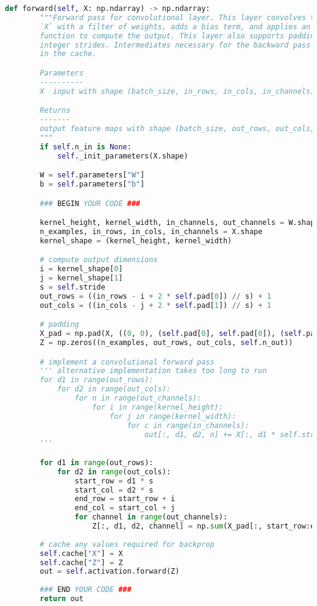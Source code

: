 \begin{lstlisting}[language=Python]
    def forward(self, X: np.ndarray) -> np.ndarray:
        """Forward pass for convolutional layer. This layer convolves the input
        `X` with a filter of weights, adds a bias term, and applies an activation
        function to compute the output. This layer also supports padding and
        integer strides. Intermediates necessary for the backward pass are stored
        in the cache.

        Parameters
        ----------
        X  input with shape (batch_size, in_rows, in_cols, in_channels)

        Returns
        -------
        output feature maps with shape (batch_size, out_rows, out_cols, out_channels)
        """
        if self.n_in is None:
            self._init_parameters(X.shape)

        W = self.parameters["W"]
        b = self.parameters["b"]

        ### BEGIN YOUR CODE ###

        kernel_height, kernel_width, in_channels, out_channels = W.shape
        n_examples, in_rows, in_cols, in_channels = X.shape
        kernel_shape = (kernel_height, kernel_width)

        # compute output dimensions
        i = kernel_shape[0]
        j = kernel_shape[1]
        s = self.stride
        out_rows = ((in_rows - i + 2 * self.pad[0]) // s) + 1
        out_cols = ((in_cols - j + 2 * self.pad[1]) // s) + 1

        # padding
        X_pad = np.pad(X, ((0, 0), (self.pad[0], self.pad[0]), (self.pad[1], self.pad[1]), (0, 0)), mode='constant')
        Z = np.zeros((n_examples, out_rows, out_cols, self.n_out))

        # implement a convolutional forward pass
        ''' alternative implementation takes too long to run
        for d1 in range(out_rows):
            for d2 in range(out_cols):
                for n in range(out_channels):
                    for i in range(kernel_height):
                        for j in range(kernel_width):
                            for c in range(in_channels):
                                out[:, d1, d2, n] += X[:, d1 * self.stride + i, d2 * self.stride + j, c] * W[i, j, c, n] + b[:, n]
        '''

        for d1 in range(out_rows):
            for d2 in range(out_cols):
                start_row = d1 * s
                start_col = d2 * s
                end_row = start_row + i
                end_col = start_col + j
                for channel in range(out_channels):
                    Z[:, d1, d2, channel] = np.sum(X_pad[:, start_row:end_row, start_col:end_col, :] * W[:, :, :, channel], axis=(1, 2, 3)) + b[:, channel]
        
        # cache any values required for backprop
        self.cache["X"] = X
        self.cache["Z"] = Z
        out = self.activation.forward(Z)
                            
        ### END YOUR CODE ###
        return out

\end{lstlisting}


